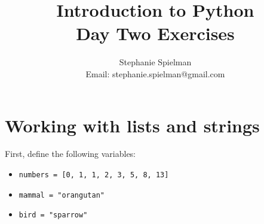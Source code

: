 \documentclass{article}[12pt]
\newcommand{\code}[1]{\texttt{#1}}  %
\begin{document}
\title{Introduction to Python \\ Day Two Exercises}
\author{Stephanie Spielman \\ \footnotesize{Email: stephanie.spielman@gmail.com}}
\date{}
\maketitle{}


\section{Working with lists and strings}

First, define the following variables: 
	\begin{itemize}
        \item \code{numbers = [0, 1, 1, 2, 3, 5, 8, 13]}
        \item \code{mammal  = "orangutan"}
        \item \code{bird    = "sparrow"}
    \end{itemize}
\end{document}
